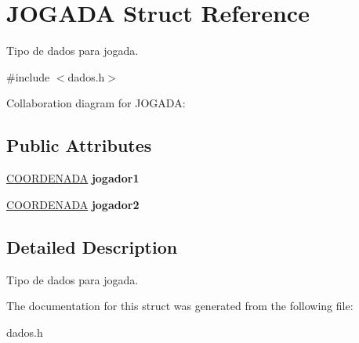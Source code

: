 \hypertarget{structJOGADA}{}\section{J\+O\+G\+A\+DA Struct Reference}
\label{structJOGADA}


Tipo de dados para jogada.  




{\ttfamily \#include $<$dados.\+h$>$}



Collaboration diagram for J\+O\+G\+A\+DA\+:
\subsection*{Public Attributes}
\begin{DoxyCompactItemize}
\item 
\mbox{\label{structJOGADA_a93d9306cb0c49b66b7d9a615bffe0149}} 
\hyperlink{structCOORDENADA}{C\+O\+O\+R\+D\+E\+N\+A\+DA} {\bfseries jogador1}
\item 
\mbox{\label{structJOGADA_ab46b16dfbdc7f2af9430c8dcdac0914b}} 
\hyperlink{structCOORDENADA}{C\+O\+O\+R\+D\+E\+N\+A\+DA} {\bfseries jogador2}
\end{DoxyCompactItemize}


\subsection{Detailed Description}
Tipo de dados para jogada. 

The documentation for this struct was generated from the following file\+:\begin{DoxyCompactItemize}
\item 
dados.\+h\end{DoxyCompactItemize}
